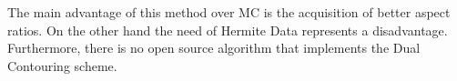 The main advantage of this method over MC is the acquisition of better aspect ratios. On the other hand the need of Hermite Data
represents a disadvantage. Furthermore, there is no open source algorithm that implements the Dual Contouring scheme.



